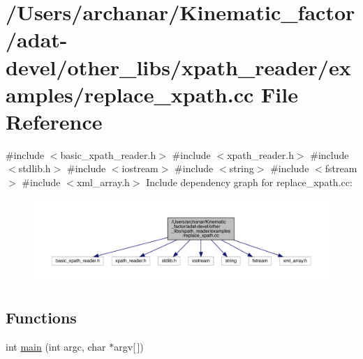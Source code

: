 \hypertarget{adat-devel_2other__libs_2xpath__reader_2examples_2replace__xpath_8cc}{}\section{/\+Users/archanar/\+Kinematic\+\_\+factor/adat-\/devel/other\+\_\+libs/xpath\+\_\+reader/examples/replace\+\_\+xpath.cc File Reference}
\label{adat-devel_2other__libs_2xpath__reader_2examples_2replace__xpath_8cc}
{\ttfamily \#include $<$basic\+\_\+xpath\+\_\+reader.\+h$>$}\newline
{\ttfamily \#include $<$xpath\+\_\+reader.\+h$>$}\newline
{\ttfamily \#include $<$stdlib.\+h$>$}\newline
{\ttfamily \#include $<$iostream$>$}\newline
{\ttfamily \#include $<$string$>$}\newline
{\ttfamily \#include $<$fstream$>$}\newline
{\ttfamily \#include $<$xml\+\_\+array.\+h$>$}\newline
Include dependency graph for replace\+\_\+xpath.\+cc\+:
\nopagebreak
\begin{figure}[H]
\begin{center}
\leavevmode
\includegraphics[width=350pt]{db/db1/adat-devel_2other__libs_2xpath__reader_2examples_2replace__xpath_8cc__incl}
\end{center}
\end{figure}
\subsection*{Functions}
\begin{DoxyCompactItemize}
\item 
int \mbox{\hyperlink{adat-devel_2other__libs_2xpath__reader_2examples_2replace__xpath_8cc_a0ddf1224851353fc92bfbff6f499fa97}{main}} (int argc, char $\ast$argv\mbox{[}$\,$\mbox{]})
\end{DoxyCompactItemize}


